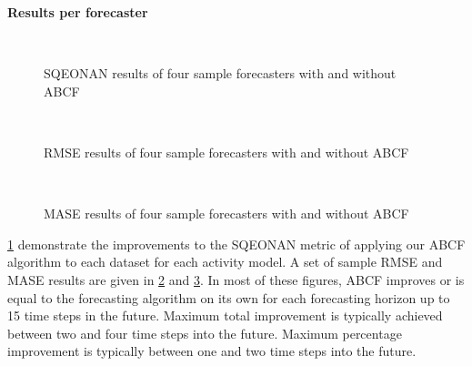 \bigskip
\noindent \textbf{Results per forecaster} 

\begin{figure}[!b]
	\begin{center}
		 \\
	\end{center}
	\caption{SQEONAN results of four sample forecasters with and without ABCF}
	\label{fig:sqe_results}
\end{figure}


\begin{figure}[!t]
	\begin{center}
		 \\
	\end{center}
	\caption{RMSE results of four sample forecasters with and without ABCF}
	\label{fig:rmse_results}
\end{figure}

\begin{figure}[!t]
	\begin{center}
		 \\
	\end{center}
	\caption{MASE results of four sample forecasters with and without ABCF}
	\label{fig:mase_results}
\end{figure}

\ref{fig:sqe_results} demonstrate the improvements to the SQEONAN metric of applying our ABCF algorithm to each dataset for each activity model.  A set of sample RMSE and MASE results are given in \ref{fig:rmse_results} and \ref{fig:mase_results}.  In most of these figures, ABCF improves or is equal to the forecasting algorithm on its own for each forecasting horizon up to 15 time steps in the future.  Maximum total improvement is typically achieved between two and four time steps into the future.  Maximum percentage improvement is typically between one and two time steps into the future.

